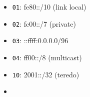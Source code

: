 \documentclass[documentation]{subfiles}
\begin{document}
\hfill
\begin{minipage}{.45\textwidth}
    \begin{center}
        \begin{itemize}
            \item {\tt 01}: fe80::/10 (link local)
            \item {\tt 02}: fc00::/7 (private)
            \item {\tt 03}: ::ffff:0.0.0.0/96
            \item {\tt 04}: ff00::/8 (multicast)
            \item {\tt 10}: 2001::/32 (teredo)
            \item[]
        \end{itemize}
    \end{center}
\end{minipage}
\end{document}
